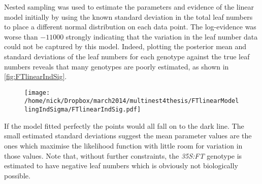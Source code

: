 Nested sampling was used to estimate the parameters and evidence of the linear model initially by using the known standard deviation in the total leaf numbers to place a different normal distribution on each data point.
The log-evidence was worse than $-11000$ strongly indicating that the variation in the leaf number data could not be captured by this model.
Indeed, plotting the posterior mean and standard deviations of the leaf numbers for each genotype against the true leaf numbers reveals that many genotypes are poorly estimated, as shown in \autoref{fig:FTlinearIndSig}.
\begin{figure}[!htbp]
\centering
\texttt{[image: /home/nick/Dropbox/march2014/multinest4thesis/FTlinearModellingIndSigma/FTlinearIndSig.pdf]}
\end{figure}
If the model fitted perfectly the points would all fall on to the dark line.
The small estimated standard deviations suggest the mean parameter values are the ones which maximise the likelihood function with little room for variation in those values.
Note that, without further constraints, the \emph{35S:FT} genotype is estimated to have negative leaf numbers which is obviously not biologically possible.

